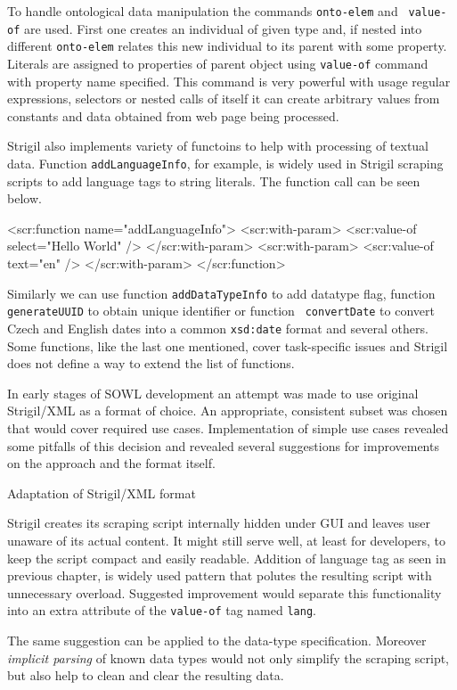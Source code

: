 To handle ontological data manipulation the commands {\tt onto-elem} and {\tt
value-of} are used. First one creates an individual of given type and, if
nested into different {\tt onto-elem} relates this new individual to its
parent with some property. Literals are assigned to properties of parent object
using {\tt value-of} command with property name specified. This command is very
powerful with usage regular expressions, selectors or nested calls of itself it
can create arbitrary values from constants and data obtained from web page
being processed. 

Strigil also implements variety of functoins to help with processing of textual
data. Function {\tt addLanguageInfo}, for example, is widely used in Strigil
scraping scripts to add language tags to string literals. The function call can
be seen below. 

\begtt
<scr:function name="addLanguageInfo">
  <scr:with-param>
    <scr:value-of select="Hello World" />
  </scr:with-param>
  <scr:with-param>
    <scr:value-of text="en" />
  </scr:with-param>
</scr:function>
\endtt

Similarly we can use function {\tt addDataTypeInfo} to add datatype flag,
function {\tt generateUUID} to obtain unique identifier or function {\tt
convertDate} to convert Czech and English dates into a common {\tt xsd:date}
format and several others. Some functions, like the last one mentioned, cover
task-specific issues and Strigil does not define a way to extend the list of
functions. 

In early stages of SOWL development an attempt was made to use original
Strigil/XML as a format of choice. An appropriate, consistent subset was chosen
that would cover required use cases. Implementation of simple use cases
revealed some pitfalls of this decision and revealed several suggestions for
improvements on the approach and the format itself. 


\secc Adaptation of Strigil/XML format

Strigil creates its scraping script internally hidden under GUI and leaves
user unaware of its actual content. It might still serve well, at least for
developers, to keep the script compact and easily readable. Addition of
language tag as seen in previous chapter, is widely used pattern that polutes
the resulting script with unnecessary overload. Suggested improvement would
separate this functionality into an extra attribute of the {\tt value-of} tag
named {\tt lang}.

The same suggestion can be applied to the data-type specification. Moreover
{\em implicit parsing} of known data types would not only simplify the scraping
script, but also help to clean and clear the resulting data. 

